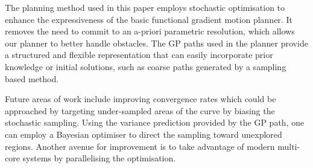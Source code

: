 \documentclass[letterpaper, 10 pt, conference]{ieeeconf}  %
\begin{document}
The planning method used in this paper employs stochastic optimisation to enhance the expressiveness of the basic functional gradient motion planner. It removes the need to commit to an a-priori parametric resolution, which allows our planner to better handle obstacles. The GP paths used in the planner provide a structured and flexible representation that can easily incorporate prior knowledge or initial solutions, such as coarse paths generated by a sampling based method. 

Future areas of work include improving convergence rates which could be approached by targeting under-sampled areas of the curve by biasing the stochastic sampling. Using the variance prediction provided by the GP path, one can employ a Bayesian optimiser to direct the sampling toward unexplored regions. Another avenue for improvement is to take advantage of modern multi-core systems by parallelising the optimisation.

\addtolength{\textheight}{-2cm}   %














\end{document}
